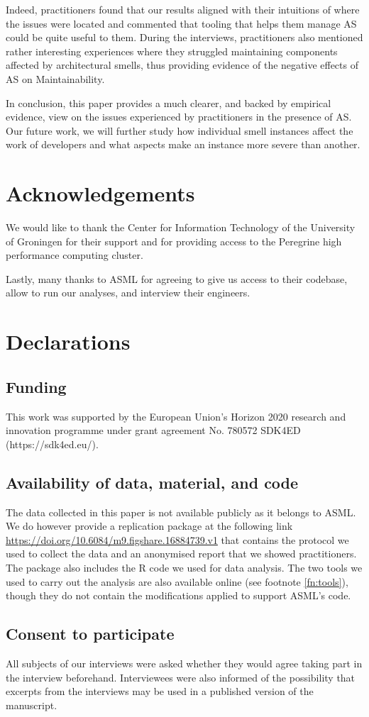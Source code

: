 Indeed, practitioners found that our results aligned with their intuitions of where the issues were located and commented that tooling that helps them manage AS could be quite useful to them.
During the interviews, practitioners also mentioned rather interesting experiences where they struggled maintaining components affected by architectural smells, thus providing evidence of the negative effects of AS on Maintainability.

In conclusion, this paper provides a much clearer, and backed by empirical evidence, view on the issues experienced by practitioners in the presence of AS.
Our future work, we will further study how individual smell instances affect the work of developers and what aspects make an instance more severe than another.

\section*{Acknowledgements}
We would like to thank the Center for Information Technology of the University of Groningen for their support and for providing access to the Peregrine high performance computing cluster.

Lastly, many thanks to ASML for agreeing to give us access to their codebase, allow to run our analyses, and interview their engineers.

\section*{Declarations}
\subsection*{Funding}
This work was supported by the European Union's Horizon 2020 research and innovation programme under grant agreement No. 780572 SDK4ED \\(https://sdk4ed.eu/).

\subsection*{Availability of data, material, and code}
The data collected in this paper is not available publicly as it belongs to ASML.
We do however provide a replication package at the following link \url{https://doi.org/10.6084/m9.figshare.16884739.v1} that contains the protocol we used to collect the data and an anonymised report that we showed practitioners.
The package also includes the R code we used for data analysis.
The two tools we used to carry out the analysis are also available online (see footnote \ref{fn:tools}), though they do not contain the modifications applied to support ASML's code.

\subsection*{Consent to participate}
All subjects of our interviews were asked whether they would agree taking part in the interview beforehand. Interviewees were also informed of the possibility that excerpts from the interviews may be used in a published version of the manuscript.
